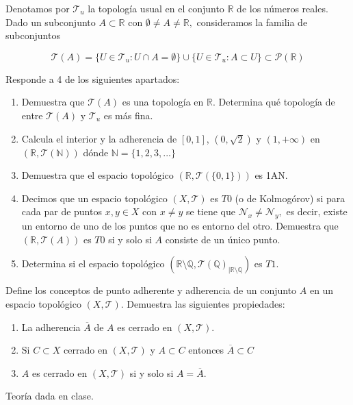 \documentclass[12pt]{article}
\begin{document}
    \begin{ejercicio}[2 puntos] Denotamos por $\mathcal{T}_{u}$ la topología usual en el conjunto $\mathbb{R}$ de los números reales.
        Dado un subconjunto $A\subset\mathbb{R}$ con $\emptyset\ne A\ne\mathbb{R},$ consideramos la familia de subconjuntos
        
        $$\mathcal{T}(A)=\{U\in\mathcal{T}_{u}:U\cap A=\emptyset\}\cup\{U\in\mathcal{T}_{u}:A\subset U\}\subset\mathcal{P}(\mathbb{R})$$
        
        Responde a 4 de los siguientes apartados:
        \begin{enumerate}[label=(\alph*)]
            \item Demuestra que $\mathcal{T}(A)$ es una topología en $\mathbb{R}$. Determina qué topología de entre $\mathcal{T}(A)$ y $\mathcal{T}_{u}$ es más fina.
            \item Calcula el interior y la adherencia de $[0, 1]$, $(0,\sqrt{2})$ y $(1,+\infty)$ en $(\mathbb{R},\mathcal{T}(\mathbb{N}))$ dónde $\mathbb{N}=\{1,2,3,...\}$
            \item Demuestra que el espacio topológico $(\mathbb{R},\mathcal{T}(\{0,1\}))$ es 1AN.
            \item Decimos que un espacio topológico $(X, \mathcal{T})$ es $T0$ (o de Kolmogórov) si para cada par de puntos $x, y\in X$ con $x\ne y$ se tiene que $\mathcal{N}_{x}\ne\mathcal{N}_{y},$ es decir, existe un entorno de uno de los puntos que no es entorno del otro.
            Demuestra que $(\mathbb{R},\mathcal{T}(A))$ es $T0$ si y solo si $A$ consiste de un único punto.
            \item Determina si el espacio topológico $(\mathbb{R}\setminus\mathbb{Q},\mathcal{T}(\mathbb{Q})_{|\mathbb{R}\setminus\mathbb{Q}})$ es $T1$.
        \end{enumerate}
    \end{ejercicio}

\newpage
\setcounter{ejercicio}{0}

    \begin{ejercicio}[1 punto] Define los conceptos de punto adherente y adherencia de un conjunto $A$ en un espacio topológico $(X,\mathcal{T})$. Demuestra las siguientes propiedades:
        \begin{enumerate}[label=(\alph*)]
            \item La adherencia $\overline{A}$ de $A$ es cerrado en $(X,\mathcal{T})$.
            \item Si $C\subset X$ cerrado en $(X,\mathcal{T})$ y $A\subset C$ entonces $\overline{A}\subset C$
            \item $A$ es cerrado en $(X,\mathcal{T})$ si y solo si $A=\overline{A}.$
        \end{enumerate}
        Teoría dada en clase.
    \end{ejercicio}
    
\end{document}
